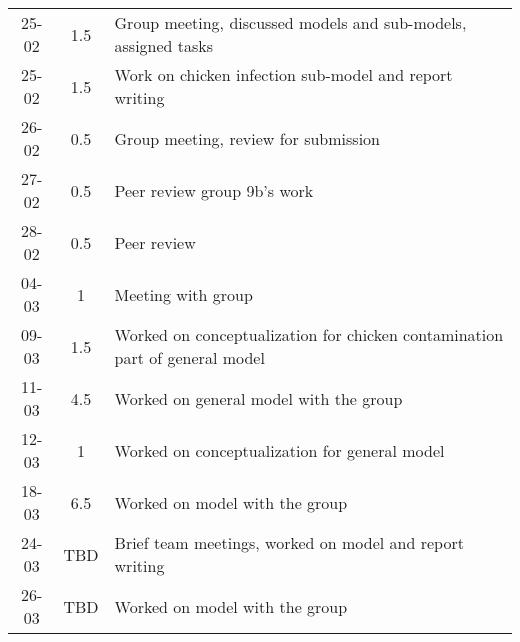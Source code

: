 \begin{longtable}[c]{c|c|m{35em}}
25-02   &   1.5     &   Group meeting, discussed models and sub-models, assigned tasks              \\
25-02   &   1.5     &   Work on chicken infection sub-model and report writing                      \\
26-02   &   0.5     &   Group meeting, review for submission                                        \\
27-02   &   0.5     &   Peer review group 9b's work                                                 \\
28-02   &   0.5     &   Peer review                                                                 \\
04-03   &   1       &   Meeting with group                                                          \\
09-03   &   1.5     &   Worked on conceptualization for chicken contamination part of general model \\
11-03   &   4.5     &   Worked on general model with the group                                      \\
12-03   &   1       &   Worked on conceptualization for general model                               \\
18-03   &   6.5     &   Worked on model with the group                                              \\
24-03   &   TBD     &   Brief team meetings, worked on model and report writing                    \\
26-03   &   TBD     &   Worked on model with the group                                              \\



\end{longtable}

